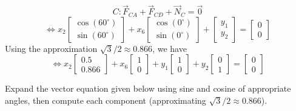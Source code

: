\begin{applicationActivities}
\begin{remark}
\[
C: \vec F_{CA}+\vec F_{CD}+\vec N_C=\vec 0
\]
\[
\Leftrightarrow
x_2\begin{bmatrix}\cos(60^\circ)\\\sin(60^\circ)\end{bmatrix}+
x_6\begin{bmatrix}\cos(0^\circ)\\\sin(0^\circ)\end{bmatrix}+
\begin{bmatrix}y_1\\y_2\end{bmatrix}=\begin{bmatrix}0\\0\end{bmatrix}
\]
Using the approximation \(\sqrt{3}/2\approx 0.866\), we have
\[
\Leftrightarrow
x_2\begin{bmatrix}0.5\\0.866\end{bmatrix}+
x_6\begin{bmatrix}1\\0\end{bmatrix}+
y_1\begin{bmatrix}1\\0\end{bmatrix}+
y_2\begin{bmatrix}0\\1\end{bmatrix}=
\begin{bmatrix}0\\0\end{bmatrix}
\]
\end{remark}

\begin{activity}{10}
Expand the vector equation given below using sine and cosine of appropriate angles,
then compute each component (approximating \(\sqrt{3}/2\approx 0.866\)).

\drawtruss{\trussStrutVariables}


\end{activity}
\end{applicationActivities}
